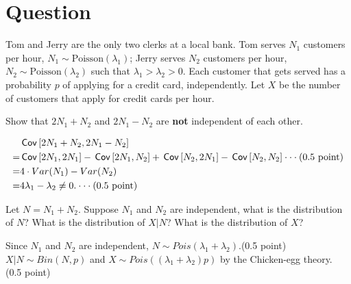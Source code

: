\section*{Question}
Tom and Jerry are the only two clerks at a local bank. Tom serves $N_1$ customers per hour, $N_1\sim \text{Poisson}(\lambda_1)$; Jerry serves $N_2$ customers per hour, $N_2\sim \text{Poisson}(\lambda_2)$ such that $\lambda_1>\lambda_2>0$. Each customer that gets served has a probability $p$ of applying for a credit card, independently. Let $X$ be the number of customers that apply for credit cards per hour.
\begin{exercise}[1]
 Show that $2N_1+N_2$ and $2N_1-N_2$ are \textbf{not} independent of each other.

\begin{solution}
\begin{align*}
   & \,\mathsf{Cov}\left[2N_1+N_2, 2N_1-N_2\right]\\
  = & \,\mathsf{Cov}\left[2N_1,2N_1\right]-\,\mathsf{Cov}\left[2N_1,N_2\right]+\,\mathsf{Cov}\left[N_2,2N_1\right]-\,\mathsf{Cov}\left[N_2,N_2\right]\cdot \cdot \cdot \text{(0.5 point)}\\
  = & 4\cdot Var(N_1)-Var(N_2)\\
  =& 4\lambda_1-\lambda_2 \neq 0.\cdot \cdot \cdot \text{(0.5 point)}
\end{align*}
\end{solution}
\end{exercise}

\begin{exercise}[1]
Let $N=N_1+N_2$. Suppose $N_1$ and $N_2$ are independent, what is the distribution of  $N$? What is the distribution of $X|N$?  What is the distribution of $X$?
\begin{solution}
Since $N_1$ and $N_2$ are independent, $N\sim Pois(\lambda_1+\lambda_2).$(0.5 point)\\
$X|N\sim Bin(N,p)$ and $X\sim Pois((\lambda_1+\lambda_2) p)$ by the Chicken-egg theory. (0.5 point)
\end{solution}
\end{exercise}


